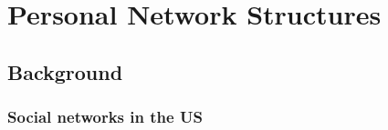\chapter{Personal Network Structures}
  \section{Background}
    \subsection{Social networks in the US}
